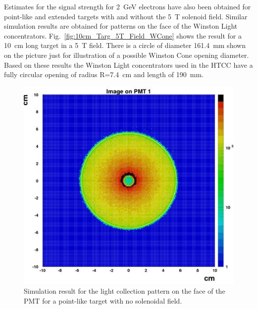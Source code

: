 Estimates for the signal strength for 2~GeV electrons have also been obtained for point-like and extended targets
with and without the 5~T solenoid field. Similar simulation results are obtained for patterns on the face of the
Winston Light concentrators. Fig.~\ref{fig:10cm_Targ_5T_Field_WCone} shows the result for a 10~cm long target
in a 5~T field. There is a circle of diameter 161.4~mm shown on the picture just for illustration of a possible Winston
Cone opening diameter. Based on these results the Winston Light concentrators used in the HTCC have a fully circular
opening of radius R=7.4~cm and length of 190~mm. 

\begin{figure}[!ht]
    \centering
    \includegraphics[width=1.0\linewidth,trim={0.0cm 0.0cm 0.0cm 0.0cm},clip]{images/Point_Targ_Zero_Field_PMT.jpg}
    \caption{Simulation result for the light collection pattern on the face of the PMT for a point-like target with no
      solenoidal field.}
    \label{fig:Point_Targ_Zero_Field_PMT}
\end{figure}

